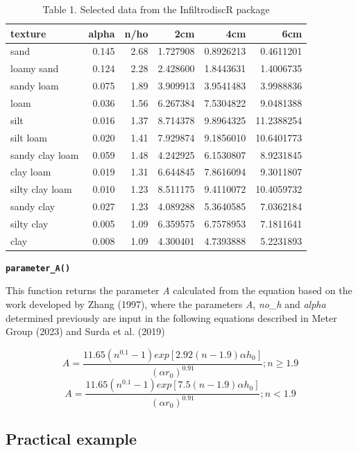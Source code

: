 \documentclass[
]{article}
\begin{document}
\begin{table}

\caption{Table 1. Selected data from the InfiltrodiscR package}
\centering
\begin{tabular}[t]{l|r|r|r|r|r}
\hline
texture & alpha & n/ho & 2cm & 4cm & 6cm\\
\hline
sand & 0.145 & 2.68 & 1.727908 & 0.8926213 & 0.4611201\\
\hline
loamy sand & 0.124 & 2.28 & 2.428600 & 1.8443631 & 1.4006735\\
\hline
sandy loam & 0.075 & 1.89 & 3.909913 & 3.9541483 & 3.9988836\\
\hline
loam & 0.036 & 1.56 & 6.267384 & 7.5304822 & 9.0481388\\
\hline
silt & 0.016 & 1.37 & 8.714378 & 9.8964325 & 11.2388254\\
\hline
silt loam & 0.020 & 1.41 & 7.929874 & 9.1856010 & 10.6401773\\
\hline
sandy clay loam & 0.059 & 1.48 & 4.242925 & 6.1530807 & 8.9231845\\
\hline
clay loam & 0.019 & 1.31 & 6.644845 & 7.8616094 & 9.3011807\\
\hline
silty clay loam & 0.010 & 1.23 & 8.511175 & 9.4110072 & 10.4059732\\
\hline
sandy clay & 0.027 & 1.23 & 4.089288 & 5.3640585 & 7.0362184\\
\hline
silty clay & 0.005 & 1.09 & 6.359575 & 6.7578953 & 7.1811641\\
\hline
clay & 0.008 & 1.09 & 4.300401 & 4.7393888 & 5.2231893\\
\hline
\end{tabular}
\end{table}

\textbf{\texttt{parameter\_A()}}

This function returns the parameter \emph{A} calculated from the
equation based on the work developed by Zhang (1997), where the
parameters \emph{A}, \emph{no\_h} and \emph{alpha} determined previously
are input in the following equations described in Meter Group (2023) and
Surda et al. (2019)

\[A = \frac{11.65(n^{0.1}-1)exp[2.92(n - 1.9)\alpha h_{0}]}{(\alpha r_{0})^{0.91}} ; n\geq 1.9 \]
\[A = \frac{11.65(n^{0.1}-1)exp[7.5(n - 1.9)\alpha h_{0}]}{(\alpha r_{0})^{0.91}} ; n < 1.9 \]

\newpage{}

\hypertarget{practical-example}{%
\subsection{Practical example}\label{practical-example}}
\end{document}
